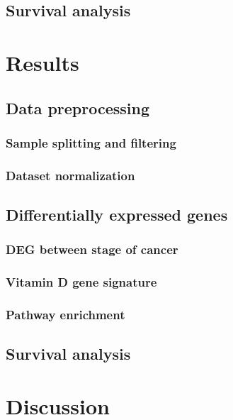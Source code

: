 \documentclass[fleqn,10pt]{SelfArx} %
\begin{document}
	\subsection{Survival analysis}

\section{Results}

	\subsection{Data preprocessing}

		\subsubsection{Sample splitting and filtering}

		\subsubsection{Dataset normalization}

	\subsection{Differentially expressed genes}

		\subsubsection{DEG between stage of cancer}

		\subsubsection{Vitamin D gene signature}

		\subsubsection{Pathway enrichment}

	\subsection{Survival analysis}


\section{Discussion}



\end{document}
